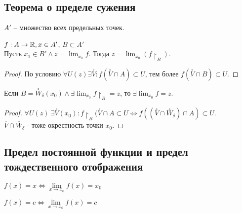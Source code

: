 \documentclass[12pt]{report}
\begin{document}
\subsection{Теорема о пределе сужения}\label{ques_16}
\begin{defn}
    $A'$ -- множество всех предельных точек.
\end{defn}
\begin{thm}
    $f: A \to \mathbb{R}, x \in A'$, $B \subset A'$\\
    Пусть $x_1 \in B' \wedge z = \lim_{x_0} f$. Тогда $z = \lim_{x_0} (f\upharpoonright_B)$.
\end{thm}
\begin{proof}
    По условию $\forall U(z) \exists \stackrel \circ V: f(\stackrel \circ V \cap A) \subset U $, тем более $f(\stackrel \circ V \cap B) \subset U$.
\end{proof}
\begin{thm}
    Если $B=\stackrel \circ W_{\delta }(x_0) \wedge \exists \lim_{x_0} f \upharpoonright_B = z$, то $\exists \lim_{x_0} f = z$.
\end{thm}
\begin{proof}
    $\forall U(z) ~\exists \stackrel \circ V(x_0): f\upharpoonright_B(\stackrel \circ V \cap A \subset U \Leftrightarrow f((\stackrel \circ V \cap \stackrel \circ W_{\delta } ) \cap A ) \subset U$.\\
    $\stackrel \circ V \cap \stackrel \circ W_{\delta }$ - тоже окрестность точки $x_0$.
\end{proof}
\subsection{Предел постоянной функции и предел тождественного отображения}\label{ques_17}
\begin{st}
    $f(x) = x \Longleftrightarrow \lim\limits_{x \to x_0} f(x) = x_0$
\end{st}
\begin{st}
    $f(x) = c \Longleftrightarrow \lim\limits_{x \to x_0} f(x) = c$
\end{st}
\end{document}
